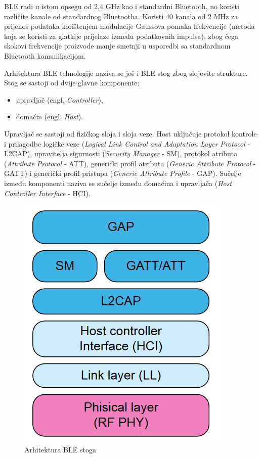 BLE radi u istom opsegu od 2,4 GHz kao i standardni Bluetooth, no koristi različite kanale od standardnog Bluetootha. Koristi 40 kanala od 2 MHz za prijenos podataka korištenjem modulacije Gaussova pomaka frekvencije (metoda koja se koristi za glatkije prijelaze između podatkovnih impulsa), zbog čega skokovi frekvencije proizvode manje smetnji u usporedbi sa standardnom Bluetooth komunikacijom.

Arhitektura BLE tehnologije naziva se još i BLE stog zbog slojevite strukture. Stog se sastoji od dvije glavne komponente:
\begin{itemize}
	\item upravljač (engl. \textit{Controller}),
	\item domaćin (engl. \textit{Host}).
\end{itemize}

Upravljač se sastoji od fizičkog sloja i sloja veze. Host uključuje protokol kontrole i prilagodbe logičke veze (\textit{Logical Link Control and Adaptation Layer Protocol} - L2CAP), upravitelja sigurnosti (\textit{Security Manager} - SM), protokol atributa (\textit{Attribute Protocol} - ATT), generički profil atributa (\textit{Generic Attribute Protocol} - GATT) i generički profil pristupa (\textit{Generic Attribute Profile} - GAP). Sučelje između komponenti naziva se sučelje između domaćina i upravljača (\textit{Host Controller Interface} - HCI).


\begin{figure}[ht]
		\centering
		\includegraphics[scale=0.5]{imgs/ble_stack_arch}
		\caption{Arhitektura BLE stoga}
		\label{fig:ble-stack-arch}
\end{figure}

